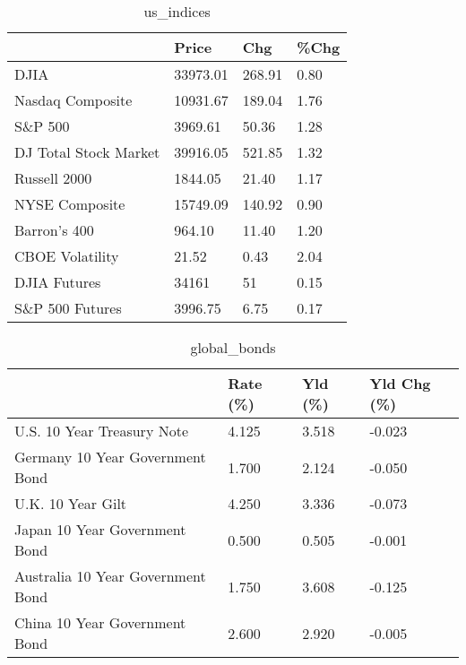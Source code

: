 \documentclass{article}%
\begin{document}
%


\begin{table}[htbp]%
\caption{us\_indices}%
\centering%
\begin{adjustbox}{width=1\textwidth}%
\begin{tabular}{llll}
\toprule
                      &    Price &    Chg & \%Chg \\
\midrule
                 DJIA & 33973.01 & 268.91 & 0.80 \\
     Nasdaq Composite & 10931.67 & 189.04 & 1.76 \\
              S\&P 500 &  3969.61 &  50.36 & 1.28 \\
DJ Total Stock Market & 39916.05 & 521.85 & 1.32 \\
         Russell 2000 &  1844.05 &  21.40 & 1.17 \\
       NYSE Composite & 15749.09 & 140.92 & 0.90 \\
         Barron's 400 &   964.10 &  11.40 & 1.20 \\
      CBOE Volatility &    21.52 &   0.43 & 2.04 \\
         DJIA Futures &    34161 &     51 & 0.15 \\
      S\&P 500 Futures &  3996.75 &   6.75 & 0.17 \\
\bottomrule
\end{tabular}
%
\end{adjustbox}%
\end{table}

%


\begin{table}[htbp]%
\caption{global\_bonds}%
\centering%
\begin{adjustbox}{width=1\textwidth}%
\begin{tabular}{llll}
\toprule
                                  & Rate (\%) & Yld (\%) & Yld Chg (\%) \\
\midrule
       U.S. 10 Year Treasury Note &    4.125 &   3.518 &      -0.023 \\
  Germany 10 Year Government Bond &    1.700 &   2.124 &      -0.050 \\
                U.K. 10 Year Gilt &    4.250 &   3.336 &      -0.073 \\
    Japan 10 Year Government Bond &    0.500 &   0.505 &      -0.001 \\
Australia 10 Year Government Bond &    1.750 &   3.608 &      -0.125 \\
    China 10 Year Government Bond &    2.600 &   2.920 &      -0.005 \\
\bottomrule
\end{tabular}
%
\end{adjustbox}%
\end{table}
\end{document}
